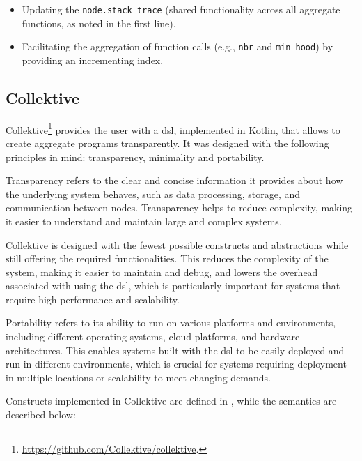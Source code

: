 \begin{itemize}
    \item Updating the \texttt{node.stack\_trace} (shared functionality across all aggregate functions, as noted in the first line).
    \item Facilitating the aggregation of function calls (e.g., \texttt{nbr} and \texttt{min\_hood}) by providing an incrementing index.
\end{itemize}



\subsection{Collektive}

Collektive\footnote{\url{https://github.com/Collektive/collektive}.} provides the user with a \ac{dsl}, implemented in Kotlin, that allows to create aggregate programs transparently. It was designed with the following principles in mind: transparency, minimality and portability.

Transparency refers to the clear and concise information it provides about how the underlying system behaves, such as data processing, storage, and communication between nodes. Transparency helps to reduce complexity, making it easier to understand and maintain large and complex systems.

Collektive is designed with the fewest possible constructs and abstractions while still offering the required functionalities. This reduces the complexity of the system, making it easier to maintain and debug, and lowers the overhead associated with using the \ac{dsl}, which is particularly important for systems that require high performance and scalability.

Portability refers to its ability to run on various platforms and environments, including different operating systems, cloud platforms, and hardware architectures. This enables systems built with the \ac{dsl} to be easily deployed and run in different environments, which is crucial for systems requiring deployment in multiple locations or scalability to meet changing demands.

Constructs implemented in Collektive are defined in , while the semantics are described below:

